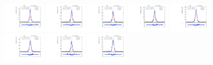 \begin{figure}[htb]
\includegraphics[width=0.19\textwidth]{plots/Appendix_Recoil_Fits/ZmmData_PF_5TeV_2G_bkg/pfu2fit_24.pdf}
\includegraphics[width=0.19\textwidth]{plots/Appendix_Recoil_Fits/ZmmData_PF_5TeV_2G_bkg/pfu2fit_25.pdf}
\includegraphics[width=0.19\textwidth]{plots/Appendix_Recoil_Fits/ZmmData_PF_5TeV_2G_bkg/pfu2fit_26.pdf}
\includegraphics[width=0.19\textwidth]{plots/Appendix_Recoil_Fits/ZmmData_PF_5TeV_2G_bkg/pfu2fit_27.pdf}
\includegraphics[width=0.19\textwidth]{plots/Appendix_Recoil_Fits/ZmmData_PF_5TeV_2G_bkg/pfu2fit_28.pdf}
\includegraphics[width=0.19\textwidth]{plots/Appendix_Recoil_Fits/ZmmData_PF_5TeV_2G_bkg/pfu2fit_29.pdf}
\includegraphics[width=0.19\textwidth]{plots/Appendix_Recoil_Fits/ZmmData_PF_5TeV_2G_bkg/pfu2fit_30.pdf}
\includegraphics[width=0.19\textwidth]{plots/Appendix_Recoil_Fits/ZmmData_PF_5TeV_2G_bkg/pfu2fit_31.pdf}

\end{figure}
